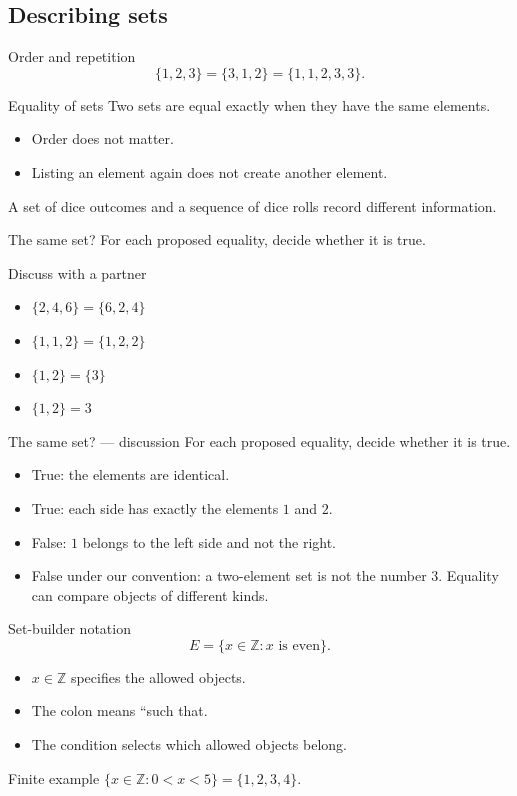 \documentclass{beamer}
\newcommand{\Z}{\mathbb{Z}}
\begin{document}
\subsection{Describing sets}
\begin{frame}{Order and repetition}
\[\{1,2,3\}=\{3,1,2\}=\{1,1,2,3,3\}.\]\begin{block}{Equality of sets}
Two sets are equal exactly when they have the same elements.
\end{block}\begin{itemize}
\item Order does not matter.
\item Listing an element again does not create another element.
\end{itemize}\medskip A set of dice outcomes and a sequence of dice rolls record different information.
\end{frame}
\begin{frame}{The same set?}
For each proposed equality, decide whether it is true.
\begin{block}{Discuss with a partner}
\begin{itemize}
\item $\{2,4,6\}=\{6,2,4\}$
\item $\{1,1,2\}=\{1,2,2\}$
\item $\{1,2\}=\{3\}$
\item $\{1,2\}=3$
\end{itemize}
\end{block}
\end{frame}
\begin{frame}{The same set? --- discussion}
For each proposed equality, decide whether it is true.
\begin{itemize}
\item True: the elements are identical.
\item True: each side has exactly the elements $1$ and $2$.
\item False: $1$ belongs to the left side and not the right.
\item False under our convention: a two-element set is not the number $3$. Equality can compare objects of different kinds.
\end{itemize}
\end{frame}
\begin{frame}{Set-builder notation}
\[E=\{x\in\Z:x\text{ is even}\}.\]\begin{itemize}
\item $x\in\Z$ specifies the allowed objects.
\item The colon means ``such that.
\item The condition selects which allowed objects belong.
\end{itemize}\begin{block}{Finite example}
$\{x\in\Z:0<x<5\}=\{1,2,3,4\}$.
\end{block}
\end{frame}
\end{document}
